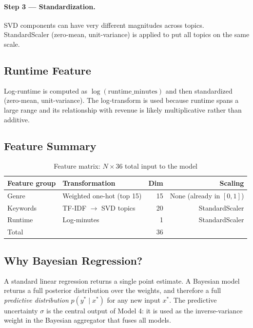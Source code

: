 \documentclass[12pt,a4paper]{article}
\begin{document}
\paragraph{Step 3 — Standardization.}
SVD components can have very different magnitudes across topics.
StandardScaler (zero-mean, unit-variance) is applied to put all topics
on the same scale.

\subsection{Runtime Feature}

Log-runtime is computed as $\log(\text{runtime\_minutes})$ and then
standardized (zero-mean, unit-variance). The log-transform is used because
runtime spans a large range and its relationship with revenue is likely
multiplicative rather than additive.

\subsection{Feature Summary}

\begin{table}[H]
\centering
\begin{tabular}{llrr}
\toprule
\textbf{Feature group} & \textbf{Transformation} & \textbf{Dim} & \textbf{Scaling} \\
\midrule
Genre        & Weighted one-hot (top 15) & 15 & None (already in $[0,1]$) \\
Keywords     & TF-IDF $\to$ SVD topics   & 20 & StandardScaler \\
Runtime      & Log-minutes               &  1 & StandardScaler \\
\midrule
Total        & & 36 & \\
\bottomrule
\end{tabular}
\caption{Feature matrix: $N \times 36$ total input to the model}
\end{table}

\subsection{Why Bayesian Regression?}

A standard linear regression returns a single point estimate.
A Bayesian model returns a full posterior distribution over the weights,
and therefore a full \emph{predictive distribution} $p(y^* \mid x^*)$ for
any new input $x^*$. The predictive uncertainty $\sigma$ is the central
output of Model 4: it is used as the inverse-variance weight in the
Bayesian aggregator that fuses all models.
\end{document}
